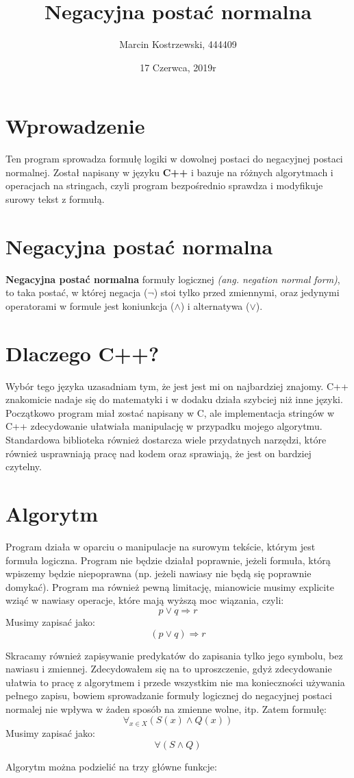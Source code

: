 ﻿\documentclass{article}
\title{Negacyjna postać normalna}
\author{Marcin Kostrzewski, 444409}
\date{17 Czerwca, 2019r}
\begin{document}
\maketitle

\section{Wprowadzenie}
Ten program sprowadza formułę logiki w dowolnej postaci do negacyjnej postaci normalnej. Został napisany w języku \textbf{C++} i bazuje na różnych algorytmach i operacjach na stringach, czyli program bezpośrednio sprawdza i modyfikuje surowy tekst z formułą. 


\section{Negacyjna postać normalna}
\textbf{Negacyjna postać normalna} formuły logicznej \textit{(ang. negation normal form)}, to taka postać, w której negacja ($\neg$) stoi tylko przed zmiennymi, oraz jedynymi operatorami w formule jest koniunkcja ($\wedge$) i alternatywa ($\vee$).

\section{Dlaczego C++?}
Wybór tego języka uzasadniam tym, że jest jest mi on najbardziej znajomy. C++ znakomicie nadaje się do matematyki i w dodaku działa szybciej niż inne języki. Początkowo program miał zostać napisany w C, ale implementacja stringów w C++ zdecydowanie ułatwiała manipulację w przypadku mojego algorytmu. Standardowa biblioteka również dostarcza wiele przydatnych narzędzi, które również usprawniają pracę nad kodem oraz sprawiają, że jest on bardziej czytelny.



\pagebreak
\section{Algorytm}
Program działa w oparciu o manipulacje na surowym tekście, którym jest formuła logiczna. Program nie będzie działał poprawnie, jeżeli formuła, którą wpiszemy będzie niepoprawna (np. jeżeli nawiasy nie będą się poprawnie domykać). Program ma również pewną limitację, mianowicie musimy explicite wziąć w nawiasy operacje, które mają wyższą moc wiązania, czyli:
    \[p \vee q \Rightarrow r\]
    \qquad Musimy zapisać jako:
    \[(p \vee q) \Rightarrow r\]
\par Skracamy również zapisywanie predykatów do zapisania tylko jego symbolu, bez nawiasu i zmiennej. Zdecydowałem się na to uproszczenie, gdyż zdecydowanie ułatwia to pracę z algorytmem i przede wszystkim nie ma konieczności używania pełnego zapisu, bowiem sprowadzanie formuły logicznej do negacyjnej postaci normalej nie wpływa w żaden sposób na zmienne wolne, itp. \newline
Zatem formułę:
    \[\forall _{x\in X} (S(x) \wedge Q(x))\]
    \qquad Musimy zapisać jako:
    \[\forall(S \wedge Q)\]
\par Algorytm można podzielić na trzy główne funkcje:
\end{document}
